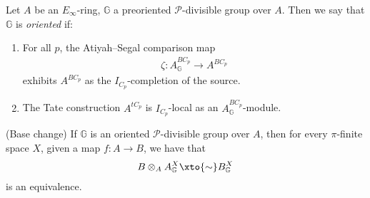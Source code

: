 \begin{definition} Let $A$ be an $E_\infty$-ring, $\mathbb{G}$ a preoriented $\mathcal{P}$-divisible group over $A$. Then we say that $\mathbb{G}$ is \textit{oriented} if:
\begin{enumerate}
    \item For all $p$, the Atiyah--Segal comparison map
    \begin{align*}
        \zeta: A_\mathbb{G}^{BC_p} \to A^{BC_p}
    \end{align*}
    exhibits $A^{BC_p}$ as the $I_{C_p}$-completion of the source.

    \item The Tate construction $A^{tC_p}$ is $I_{C_p}$-local as an $A_\mathbb{G}^{BC_p}$-module.
\end{enumerate}
\end{definition}

\begin{theorem} (Base change) If $\mathbb{G}$ is an oriented $\mathcal{P}$-divisible group over $A$, then for every $\pi$-finite space $X$, given a map $f: A \to B$, we have that
\begin{align*}
    B \otimes_A A_\mathbb{G}^X \xto{\sim} B_\mathbb{G}^X
\end{align*}
is an equivalence.
\end{theorem}

